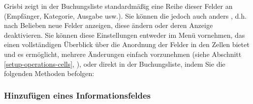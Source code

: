 Grisbi zeigt in der Buchungsliste standardmäßig eine Reihe dieser Felder an (Empfänger, Kategorie, Ausgabe usw.). Sie können die  jedoch auch anders , d.h. nach Belieben neue Felder anzeigen, diese ändern oder deren Anzeige deaktivieren.
Sie können diese Einstellungen entweder im Menü  vornehmen, das einen vollständigen Überblick über die Anordnung der Felder in den Zellen bietet und es ermöglicht, mehrere Änderungen einfach vorzunehmen (siehe Abschnitt \vref{setup-operations-cells}, ), oder direkt in der Buchungsliste, indem Sie die folgenden Methoden befolgen:


\subsubsection{Hinzufügen eines Informationsfeldes\label{transactions-list-fields-add}}

